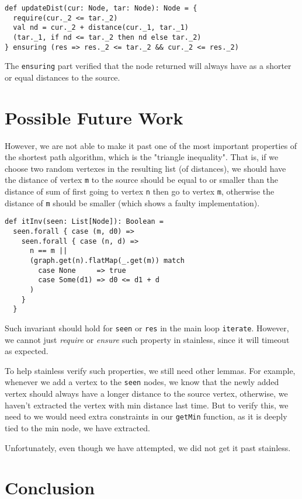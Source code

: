 \documentclass[11pt,a4paper]{article}
\begin{document}
\begin{lstlisting}
def updateDist(cur: Node, tar: Node): Node = {
  require(cur._2 <= tar._2)
  val nd = cur._2 + distance(cur._1, tar._1)
  (tar._1, if nd <= tar._2 then nd else tar._2)
} ensuring (res => res._2 <= tar._2 && cur._2 <= res._2)
\end{lstlisting}

The \texttt{ensuring} part verified that the node returned will always have
as a shorter or equal distances to the source.

\section{Possible Future Work}
However, we are not able to make it past one of the most important properties of the 
shortest path algorithm, which is the "triangle inequality". That is, if we choose two
random vertexes in the resulting list (of distances), we should have the distance
of vertex \texttt{m} to the source should be equal to or smaller than the distance of
sum of first going to vertex \texttt{n} then go to vertex \texttt{m}, otherwise the
distance of \texttt{m} should be smaller (which shows a faulty implementation).

\begin{lstlisting}
def itInv(seen: List[Node]): Boolean =
  seen.forall { case (m, d0) =>
    seen.forall { case (n, d) =>
      n == m ||
      (graph.get(n).flatMap(_.get(m)) match
        case None     => true
        case Some(d1) => d0 <= d1 + d
      )
    }
  }
\end{lstlisting}

Such invariant should hold for \texttt{seen} or \texttt{res} in the main loop \texttt{iterate}.
However, we cannot just \textit{require} or \textit{ensure} such property in stainless, since it will
timeout as expected.

To help stainless verify such properties, we still need other lemmas. For example, whenever we add a vertex
to the \texttt{seen} nodes, we know that the newly added vertex should always have a longer distance
to the source vertex, otherwise, we haven't extracted the vertex with min distance last time. But to verify
this, we need to we would need extra constraints in our \texttt{getMin} function, as it is deeply tied
to the min node, we have extracted.

Unfortunately, even though we have attempted, we did not get it past stainless.

\section{Conclusion}
\end{document}

